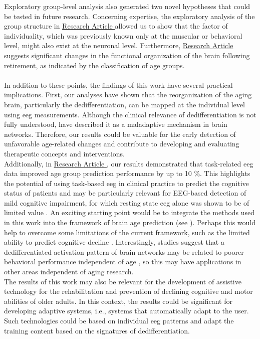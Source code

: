 Exploratory group-level analysis also generated two novel hypotheses that could be tested in future research. Concerning expertise, the exploratory analysis of the group structure in \hyperref[results:paperIII]{Research Article } allowed us to show that the factor of individuality, which was previously known only at the muscular or behavioral level, might also exist at the neuronal level. Furthermore, \hyperref[results:paperII]{Research Article } suggests significant changes in the functional organization of the brain following retirement, as indicated by the classification of age groups.\\
\\
In addition to these points, the findings of this work have several practical implications. First, our analyses have shown that the reorganization of the aging brain, particularly the dedifferentiation, can be mapped at the individual level using \gls{eeg} measurements. Although the clinical relevance of dedifferentiation is not fully understood, \citeauthor{Fornito2015} \cite{Fornito2015} have described it as a maladaptive mechanism in brain networks. Therefore, our results could be valuable for the early detection of unfavorable age-related changes and contribute to developing and evaluating therapeutic concepts and interventions.\\
Additionally, in \hyperref[results:paperII]{Research Article }, our results demonstrated that task-related \gls{eeg} data improved age group prediction performance by up to 10 \%. This highlights the potential of using task-based \gls{eeg} in clinical practice to predict the cognitive status of patients and may be particularly relevant for EEG-based detection of mild cognitive impairment, for which resting state \gls{eeg} alone was shown to be of limited value \cite{Froehlich2021, Farina2020}. An exciting starting point would be to integrate the methods used in this work into the framework of brain age prediction (see ). Perhaps this would help to overcome some limitations of the current framework, such as the limited ability to predict cognitive decline \cite{Tetereva2023}. Interestingly, studies suggest that a dedifferentiated activation pattern of brain networks may be related to poorer behavioral performance independent of age \cite{Koen2019}, so this may have applications in other areas independent of aging research.\\
The results of this work may also be relevant for the development of assistive technology for the rehabilitation and prevention of declining cognitive and motor abilities of older adults. In this context, the results could be significant for developing adaptive systems, i.e., systems that automatically adapt to the user. Such technologies could be based on individual \gls{eeg} patterns and adapt the training content based on the signatures of dedifferentiation.\\

